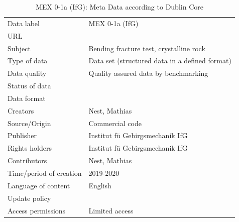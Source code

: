 \begin{table}[!ht]
\caption{MEX 0-1a (IfG): Meta Data according to Dublin Core}
\label{tab:dms-mex0-1a}
\small
\begin{tabular}{R{3.5cm}|L{7.5cm}}
\hline
%
Data label & MEX 0-1a (IfG) \\
URL &  \\ 
Subject  & Bending fracture test, crystalline rock \\
Type of data  & Data set (structured data in a defined format) \\
Data quality  & Quality assured data by benchmarking \\
Status of data  &  \\
Data format  &  \\
Creators  & Nest, Mathias  \\
Source/Origin & Commercial code \\
Publisher  & Institut f\"u Gebirgsmechanik IfG \\
Rights holders & Institut f\"u Gebirgsmechanik IfG \\
Contributors & Nest, Mathias \\
Time/period of creation & 2019-2020 \\
Language of content & English \\
Update policy &  \\
Access permissions & Limited access \\
%
\hline
\end{tabular}
\end{table}